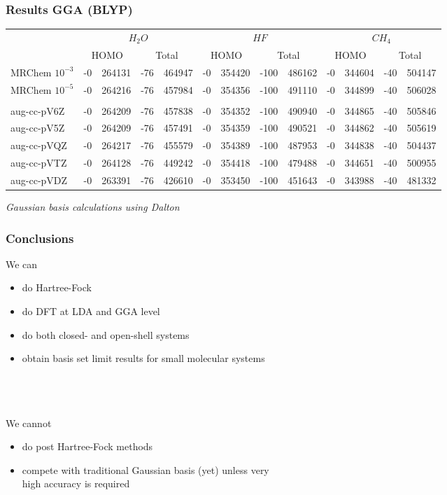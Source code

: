 \documentclass[slides]{beamer}
\begin{document}
\begin{frame}
	\frametitle{Results GGA (BLYP)}
	\begin{table}
		\tiny
		\centering
		\begin{tabular}{|l|r@{.}lr@{.}l|r@{.}lr@{.}l|r@{.}lr@{.}l|}
			\hline&
			\multicolumn{4}{c|}{$H_2O$}&
			\multicolumn{4}{c|}{$HF$}&
			\multicolumn{4}{c|}{$CH_4$}\\
			&
			\multicolumn{2}{c}{HOMO}&
			\multicolumn{2}{c|}{Total}&
			\multicolumn{2}{c}{HOMO}&
			\multicolumn{2}{c|}{Total}&
			\multicolumn{2}{c}{HOMO}&
			\multicolumn{2}{c|}{Total}\\
			\hline
			MRChem $10^{-3}$&
			  -0&264131&
			 -76&464947&
			  -0&354420&
			-100&486162&
			  -0&344604&
			 -40&504147\\
			MRChem $10^{-5}$&
			  -0&264216&
			 -76&457984&
			  -0&354356&
			-100&491110&
			  -0&344899&
			 -40&506028\\
			&\multicolumn{4}{c|}{}&
			\multicolumn{4}{c|}{}&
			\multicolumn{4}{c|}{}\\
			aug-cc-pV6Z&
			  -0&264209&
			 -76&457838&
			  -0&354352&
			-100&490940&
			  -0&344865&
			 -40&505846\\
			aug-cc-pV5Z&
			  -0&264209&
			 -76&457491&
			  -0&354359&
			-100&490521&
			  -0&344862&
			 -40&505619\\
			aug-cc-pVQZ&
			  -0&264217&
			 -76&455579&
			  -0&354389&
			-100&487953&
			  -0&344838&
			 -40&504437\\
			aug-cc-pVTZ&
			  -0&264128&
			 -76&449242&
			  -0&354418&
			-100&479488&
			  -0&344651&
			 -40&500955\\
			aug-cc-pVDZ&
			  -0&263391&
			 -76&426610&
			  -0&353450&
			-100&451643&
			  -0&343988&
			 -40&481332\\
			\hline
		\end{tabular}
	\end{table}
	\tiny
	\it{Gaussian basis calculations using Dalton}\\
\end{frame}

\begin{frame}
    \frametitle{Conclusions}
    We can
    \begin{itemize}
	\item do Hartree-Fock
	\item do DFT at LDA and GGA level
	\item do both closed- and open-shell systems
	\item obtain basis set limit results for small molecular systems
    \end{itemize}
    \ \\
    \ \\
    \ \\
    \pause
    We cannot
    \begin{itemize}
	\item do post Hartree-Fock methods
	\item compete with traditional Gaussian basis (yet) unless very \\
		high accuracy is required 
    \end{itemize}
\end{frame}
\end{document}
